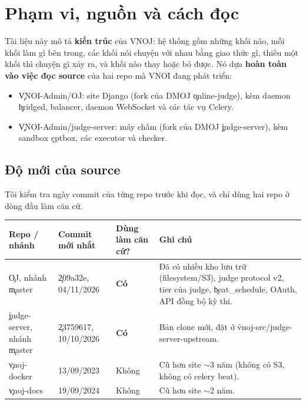 \section{Phạm vi, nguồn và cách đọc}
Tài liệu này mô tả \textbf{kiến trúc} của VNOJ: hệ thống gồm những khối nào, mỗi khối làm gì bên trong, các khối nói chuyện với nhau bằng giao thức gì, thiếu một khối thì chuyện gì xảy ra, và khối nào thay hoặc bỏ được. Nó dựa \textbf{hoàn toàn vào việc đọc source} của hai repo mà VNOI đang phát triển:
\begin{itemize}
\item \c{VNOI-Admin/OJ}: site Django (fork của DMOJ \c{online-judge}), kèm daemon \c{bridged}, balancer, daemon WebSocket và các tác vụ Celery.
\item \c{VNOI-Admin/judge-server}: máy chấm (fork của DMOJ \c{judge-server}), kèm sandbox \c{cptbox}, các executor và checker.
\end{itemize}

\subsection{Độ mới của source}
Tôi kiểm tra ngày commit của từng repo trước khi đọc, và chỉ dùng hai repo ở dòng đầu làm căn cứ.
\begin{center}\small
\begin{tabularx}{\textwidth}{@{}L{3.1cm}L{2.6cm}L{2.6cm}Y@{}}
\toprule
Repo / nhánh & Commit mới nhất & Dùng làm căn cứ? & Ghi chú \\
\midrule
\c{OJ}, nhánh \c{master} & \c{209a32e}, 04/11/2026 & \textbf{Có} & Đã có nhiều kho lưu trữ (filesystem/S3), judge protocol v2, tier của judge, \c{beat_schedule}, OAuth, API đồng bộ kỳ thi. \\
\c{judge-server}, nhánh \c{master} & \c{23759617}, 10/10/2026 & \textbf{Có} & Bản clone mới, đặt ở \f{vnoj-src/judge-server-upstream}. \\
\c{vnoj-docker} & 13/09/2023 & Không & Cũ hơn site ${\sim}$3 năm (không có S3, không có celery beat). \\
\c{vnoj-docs} & 19/09/2024 & Không & Cũ hơn site ${\sim}$2 năm. \\
\bottomrule
\end{tabularx}
\end{center}

